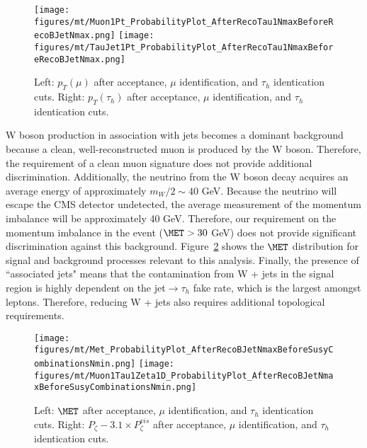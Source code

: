 \begin{figure}\centering
  \texttt{[image: figures/mt/Muon1Pt\_ProbabilityPlot\_AfterRecoTau1NmaxBeforeRecoBJetNmax.png]}
  \texttt{[image: figures/mt/TauJet1Pt\_ProbabilityPlot\_AfterRecoTau1NmaxBeforeRecoBJetNmax.png]}
  \caption{\label{fig:muTauKinematics} Left: $p_{T}(\mu)$ after acceptance, $\mu$ identification, and $\tau_{h}$ identication cuts.  Right: 
$p_{T}(\tau_{h})$ after acceptance, $\mu$ identification, and $\tau_{h}$ identication cuts.}
\end{figure}

W boson production in association with jets becomes a dominant background because a clean, well-reconstructed muon is produced by the W boson. 
Therefore, the requirement of a clean muon signature does not provide additional discrimination. Additionally, the neutrino from the W boson decay acquires 
an average energy of approximately $m_{W}/2 \sim 40$ GeV. Because the neutrino will escape the CMS detector undetected, the average measurement of the momentum 
imbalance will be approximately 40 GeV. Therefore, our requirement on the momentum imbalance in the event ($\MET > 30$ GeV) does not provide significant 
discrimination against this background. 
Figure~\ref{fig:muTauTopologicalVariables} shows
the $\MET$ distribution for signal and background processes relevant to this analysis. 
Finally, the presence of ``associated jets" means that the contamination from W + jets in the signal region is 
highly dependent on the jet$\to\tau_{h}$ fake rate, which is the largest amongst leptons. Therefore, reducing W + jets also requires additional 
topological requirements. 

\begin{figure}\centering
  \texttt{[image: figures/mt/Met\_ProbabilityPlot\_AfterRecoBJetNmaxBeforeSusyCombinationsNmin.png]}
  \texttt{[image: figures/mt/Muon1Tau1Zeta1D\_ProbabilityPlot\_AfterRecoBJetNmaxBeforeSusyCombinationsNmin.png]}
  \caption{\label{fig:muTauTopologicalVariables} Left: $\MET$ after acceptance, $\mu$ identification, and 
$\tau_{h}$ identication cuts.  Right: $P_{\zeta}- 3.1 \times P_{\zeta}^{vis}$ after acceptance, $\mu$ identification, and $\tau_{h}$ identication cuts.}
\end{figure}

